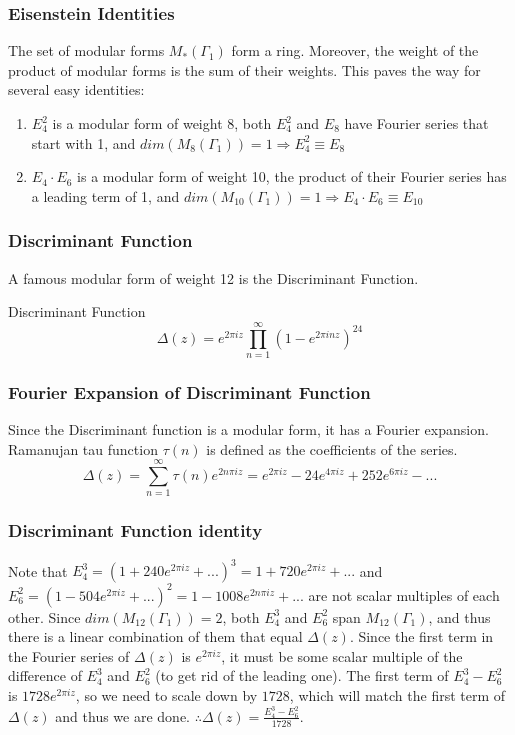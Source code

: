 \documentclass{beamer}
\begin{document}
\begin{frame}
\frametitle{Eisenstein Identities}
The set of modular forms $M_{*}(\Gamma_1)$ form a ring. Moreover, the weight of the product of  modular forms is the sum of their weights. This paves the way for several easy identities: \\
\begin{enumerate}
\item $E_4^2$ is a modular form of weight $8$, both $E_4^2$ and $E_8$ have Fourier series that start with 1, and $dim(M_8(\Gamma_1)) = 1 \Rightarrow E_4^2 \equiv E_8$  
\item  $E_4 \cdot E_6$ is a modular form of weight 10, the product of their Fourier series has a leading term of 1, and $dim(M_{10}(\Gamma_1)) = 1 \Rightarrow E_4 \cdot E_6 \equiv E_{10}$
\end{enumerate}
\end{frame}

\begin{frame}
\frametitle{Discriminant Function}
A famous modular form of weight 12 is the Discriminant Function. 
\begin{block}{Discriminant Function}
$$\Delta(z) = e^{2 \pi i z} \prod_{n=1}^{\infty} (1-e^{2 \pi i n z})^{24}$$
\end{block}
\end{frame}

\begin{frame}
\frametitle{Fourier Expansion of Discriminant Function}
Since the Discriminant function is a modular form, it has a Fourier expansion. Ramanujan tau function $\tau(n)$ is defined as the coefficients of the series. \\
$$\Delta(z) = \sum_{n = 1}^{\infty} \tau(n) e^{2n\pi i z} = e^{2 \pi i z} - 24 e^{4\pi i z} + 252 e^{6 \pi i z} -...$$
\end{frame}

\begin{frame}
\frametitle{Discriminant Function identity}
Note that $E_4^3 = (1 + 240e^{2\pi i z} + ...)^3 = 1+720e^{2\pi i z}+...$ and $E_6^2 = (1-504e^{2\pi i z}+...)^2 = 1 - 1008 e^{2n\pi i z}+...$ are not scalar multiples of each other. Since $dim(M_{12}(\Gamma_1)) = 2$, both $E_4^3$ and $E_6^2$ span $M_{12}(\Gamma_1)$, and thus there is a linear combination of them that equal $\Delta(z)$. Since the first term in the Fourier series of $\Delta(z)$ is $e^{2\pi i z}$, it must be some scalar multiple of the difference of  $E_4^3$ and $E_6^2$ (to get rid of the leading one). The first term of $E_4^3 - E_6^2$ is $1728e^{2\pi i z}$, so we need to scale down by $1728$, which will match the first term of $\Delta(z)$ and thus we are done. $\therefore \Delta(z) = \frac{E_4^3 - E_6^2}{1728}$. 
\end{frame}
\end{document}
